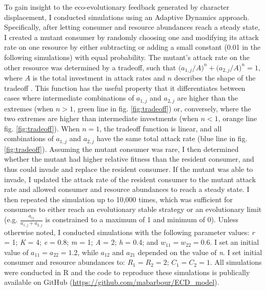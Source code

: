 \documentclass[11pt,]{article}
\begin{document}
To gain insight to the eco-evolutionary feedback generated by character
displacement, I conducted simulations using an Adaptive Dynamics
approach. Specifically, after letting consumer and resource abundances
reach a steady state, I created a mutant consumer by randomly choosing
one and modifying its attack rate on one resource by either subtracting
or adding a small constant (0.01 in the following simulations) with
equal probability. The mutant's attack rate on the other resource was
determined by a tradeoff, such that
\(\big(a_{\text{1},j}/{A}\big)^n+\big(a_{\text{2},j}/{A}\big)^n=1\),
where \(A\) is the total investment in attack rates and \(n\) describes
the shape of the tradeoff \citep{Sargent2006}. This function has the
useful property that it differentiates between cases where intermediate
combinations of \(a_{\text{1},j}\) and \(a_{\text{2},j}\) are higher
than the extremes (when \(n>1\), green line in fig. \ref{fig:tradeoff})
or, conversely, where the two extremes are higher than intermediate
investments (when \(n<1\), orange line fig. \ref{fig:tradeoff}). When
\(n=1\), the tradeoff function is linear, and all combinations of
\(a_{\text{1},j}\) and \(a_{\text{2},j}\) have the same total attack
rate (blue line in fig. \ref{fig:tradeoff}). Assuming the mutant
consumer was rare, I then determined whether the mutant had higher
relative fitness than the resident consumer, and thus could invade and
replace the resident consumer. If the mutant was able to invade, I
updated the attack rate of the resident consumer to the mutant attack
rate and allowed consumer and resource abundances to reach a steady
state. I then repeated the simulation up to 10,000 times, which was
sufficient for consumers to either reach an evolutionary stable strategy
\citep[ESS,][]{Smith1973} or an evolutionary limit (e.g.
\(\frac{a_{ij}}{a_{\text{1},j}+a_{\text{2},j}}\) is constrained to a
maximum of 1 and minimum of 0). Unless otherwise noted, I conducted
simulations with the following parameter values: \emph{r} = 1; \emph{K}
= 4; \emph{e} = 0.8; \emph{m} = 1; \emph{A} = 2; \emph{h} = 0.4; and
\(w_{11} = w_{22} = 0.6\). I set an initial value of
\(a_{11} = a_{22} = 1.2\), while \(a_{12}\) and \(a_{21}\) depended on
the value of \emph{n}. I set initial consumer and resource abundances
to: \(R_1 = R_2 = 2\); \(C_1 = C_2 = 1\). All simulations were conducted
in R \citep{R} and the code to reproduce these simulations is publically
available on GitHub (\url{https://github.com/mabarbour/ECD_model}).
\end{document}
